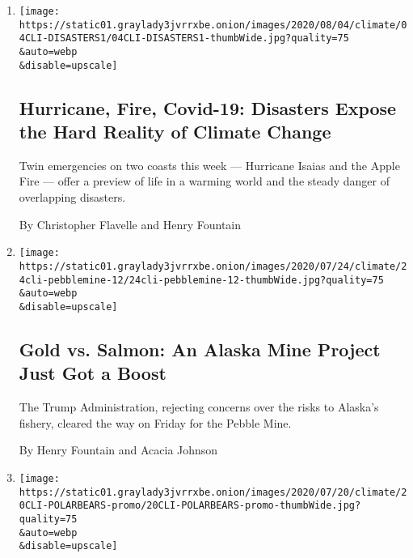 \begin{enumerate}
\def\labelenumi{\arabic{enumi}.}
\item
  \href{/2020/08/04/climate/hurricane-isaias-apple-fire-climate.html}{}

  \texttt{[image: https://static01.graylady3jvrrxbe.onion/images/2020/08/04/climate/04CLI-DISASTERS1/04CLI-DISASTERS1-thumbWide.jpg?quality=75\\\&auto=webp\\\&disable=upscale]}

  \hypertarget{hurricane-fire-covid-19-disasters-expose-the-hard-reality-of-climate-change}{%
  \subsection{Hurricane, Fire, Covid-19: Disasters Expose the Hard
  Reality of Climate
  Change}\label{hurricane-fire-covid-19-disasters-expose-the-hard-reality-of-climate-change}}

  Twin emergencies on two coasts this week --- Hurricane Isaias and the
  Apple Fire --- offer a preview of life in a warming world and the
  steady danger of overlapping disasters.

  By Christopher Flavelle and Henry Fountain
\item
  \href{/2020/07/24/climate/pebble-mine-alaska-environment.html}{}

  \texttt{[image: https://static01.graylady3jvrrxbe.onion/images/2020/07/24/climate/24cli-pebblemine-12/24cli-pebblemine-12-thumbWide.jpg?quality=75\\\&auto=webp\\\&disable=upscale]}

  \hypertarget{gold-vs-salmon-an-alaska-mine-project-just-got-a-boost}{%
  \subsection{Gold vs. Salmon: An Alaska Mine Project Just Got a
  Boost}\label{gold-vs-salmon-an-alaska-mine-project-just-got-a-boost}}

  The Trump Administration, rejecting concerns over the risks to
  Alaska's fishery, cleared the way on Friday for the Pebble Mine.

  By Henry Fountain and Acacia Johnson
\item
  \href{/2020/07/20/climate/polar-bear-extinction.html}{}

  \texttt{[image: https://static01.graylady3jvrrxbe.onion/images/2020/07/20/climate/20CLI-POLARBEARS-promo/20CLI-POLARBEARS-promo-thumbWide.jpg?quality=75\\\&auto=webp\\\&disable=upscale]}

  \hypertarget{global-warming-is-driving-polar-bears-toward-extinction-researchers-say}{%
}
\end{enumerate}
